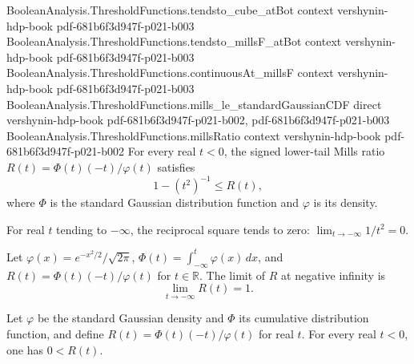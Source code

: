 \begin{lemma}
  {BooleanAnalysis.ThresholdFunctions.tendsto_cube_atBot}
  {context}
  {vershynin-hdp-book}
  {pdf-681b6f3d947f-p021-b003}
\proofstep
  {BooleanAnalysis.ThresholdFunctions.tendsto_millsF_atBot}
  {context}
  {vershynin-hdp-book}
  {pdf-681b6f3d947f-p021-b003}
\proofstep
  {BooleanAnalysis.ThresholdFunctions.continuousAt_millsF}
  {context}
  {vershynin-hdp-book}
  {pdf-681b6f3d947f-p021-b003}
\proofstep
  {BooleanAnalysis.ThresholdFunctions.mills_le_standardGaussianCDF}
  {direct}
  {vershynin-hdp-book}
  {pdf-681b6f3d947f-p021-b002,
    pdf-681b6f3d947f-p021-b003}
\proofstep
  {BooleanAnalysis.ThresholdFunctions.millsRatio}
  {context}
  {vershynin-hdp-book}
  {pdf-681b6f3d947f-p021-b002}
For every real $t<0$, the signed lower-tail Mills ratio $R(t)=\Phi(t)(-t)/\varphi(t)$
satisfies
\[
1-(t^2)^{-1}\le R(t),
\]
where $\Phi$ is the standard Gaussian distribution function and $\varphi$ is its
density.
\end{lemma}

\begin{lemma}
\leanok
{}
For real $t$ tending to $-\infty$, the reciprocal square tends to zero: $\lim_{t\to
-\infty} 1/t^2=0$.
\end{lemma}

\begin{lemma}
\leanok
{}
Let $\varphi(x)=e^{-x^2/2}/\sqrt{2\pi}$, $\Phi(t)=\int_{-\infty}^{t}\varphi(x)\,dx$, and $R(t)=\Phi(t)(-t)/\varphi(t)$ for $t\in\mathbb R$. The limit of $R$ at negative infinity is
\[
\lim_{t\to-\infty}R(t)=1.
\]
\end{lemma}

\begin{lemma}
\leanok
{}
Let $\varphi$ be the standard Gaussian density and $\Phi$ its cumulative distribution
function, and define $R(t)=\Phi(t)(-t)/\varphi(t)$ for real $t$. For every real $t<0$,
one has $0<R(t)$.
\end{lemma}

